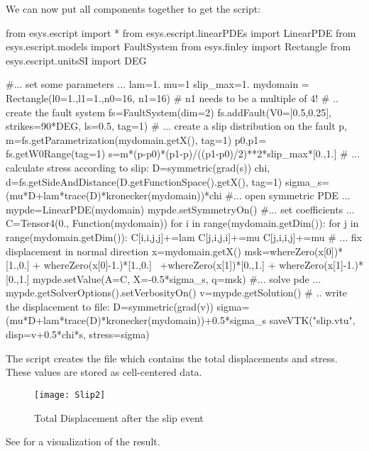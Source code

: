We can now put all components together to get the script:
\begin{python}
  from esys.escript import *
  from esys.escript.linearPDEs import LinearPDE
  from esys.escript.models import FaultSystem
  from esys.finley import Rectangle
  from esys.escript.unitsSI import DEG

  #... set some parameters ...
  lam=1.
  mu=1
  slip_max=1.
  mydomain = Rectangle(l0=1.,l1=1.,n0=16, n1=16)  # n1 needs to be a multiple of 4!
  # .. create the fault system
  fs=FaultSystem(dim=2)
  fs.addFault(V0=[0.5,0.25], strikes=90*DEG, ls=0.5, tag=1)
  # ... create a slip distribution on the fault
  p, m=fs.getParametrization(mydomain.getX(), tag=1)
  p0,p1= fs.getW0Range(tag=1)
  s=m*(p-p0)*(p1-p)/((p1-p0)/2)**2*slip_max*[0.,1.]
  # ... calculate stress according to slip:
  D=symmetric(grad(s))
  chi, d=fs.getSideAndDistance(D.getFunctionSpace().getX(), tag=1)
  sigma_s=(mu*D+lam*trace(D)*kronecker(mydomain))*chi
  #... open symmetric PDE ...
  mypde=LinearPDE(mydomain)
  mypde.setSymmetryOn()
  #... set coefficients ...
  C=Tensor4(0., Function(mydomain))
  for i in range(mydomain.getDim()):
    for j in range(mydomain.getDim()):
       C[i,i,j,j]+=lam
       C[j,i,j,i]+=mu
       C[j,i,i,j]+=mu
  # ... fix displacement in normal direction
  x=mydomain.getX()
  msk=whereZero(x[0])*[1.,0.] + whereZero(x[0]-1.)*[1.,0.] \
     +whereZero(x[1])*[0.,1.] + whereZero(x[1]-1.)*[0.,1.]
  mypde.setValue(A=C, X=-0.5*sigma_s, q=msk)
  #... solve pde ...
  mypde.getSolverOptions().setVerbosityOn()
  v=mypde.getSolution()
  # .. write the displacement to file:
  D=symmetric(grad(v))
  sigma=(mu*D+lam*trace(D)*kronecker(mydomain))+0.5*sigma_s
  saveVTK("slip.vtu", disp=v+0.5*chi*s, stress=sigma)
\end{python}
The script creates the file  which contains the total
displacements and stress.
These values are stored as cell-centered data.
%
\begin{figure} [ht]
\centerline{\texttt{[image: Slip2]}}
\caption{Total Displacement after the slip event}
\label{fig:slip.2}
\end{figure}
%
See  for a visualization of the result.

